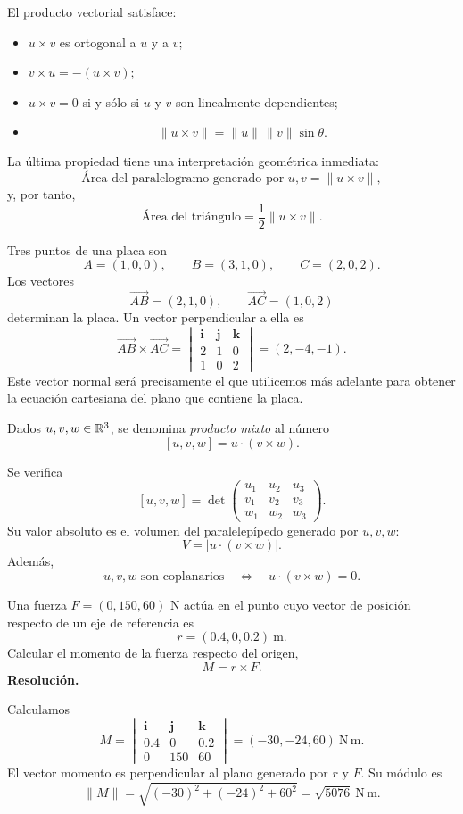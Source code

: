 El producto vectorial satisface:
\begin{itemize}
\item $u\times v$ es ortogonal a $u$ y a $v$;
\item $v\times u=-(u\times v)$;
\item $u\times v=0$ si y sólo si $u$ y $v$ son linealmente dependientes;
\item
\[
\|u\times v\|=\|u\|\,\|v\|\sin\theta.
\]
\end{itemize}

La última propiedad tiene una interpretación geométrica inmediata:
\[
\text{Área del paralelogramo generado por }u,v
=\|u\times v\|,
\]
y, por tanto,
\[
\text{Área del triángulo}
=\frac12\|u\times v\|.
\]

\begin{example}
Tres puntos de una placa son
\[
A=(1,0,0),\qquad B=(3,1,0),\qquad C=(2,0,2).
\]
Los vectores
\[
\overrightarrow{AB}=(2,1,0),
\qquad
\overrightarrow{AC}=(1,0,2)
\]
determinan la placa. Un vector perpendicular a ella es
\[
\overrightarrow{AB}\times\overrightarrow{AC}
=
\begin{vmatrix}
\mathbf i&\mathbf j&\mathbf k\\
2&1&0\\
1&0&2
\end{vmatrix}
=(2,-4,-1).
\]
Este vector normal será precisamente el que utilicemos más adelante para obtener la ecuación cartesiana del plano que contiene la placa.
\end{example}

\begin{definition}
Dados $u,v,w\in\mathbb{R}^3$, se denomina \emph{producto mixto} al número
\[
[u,v,w]=u\cdot(v\times w).
\]
\end{definition}

Se verifica
\[
[u,v,w]
=
\det
\begin{pmatrix}
u_1&u_2&u_3\\
v_1&v_2&v_3\\
w_1&w_2&w_3
\end{pmatrix}.
\]
Su valor absoluto es el volumen del paralelepípedo generado por $u,v,w$:
\[
V=|u\cdot(v\times w)|.
\]
Además,
\[
u,v,w\text{ son coplanarios}
\quad\Longleftrightarrow\quad
u\cdot(v\times w)=0.
\]

\begin{solvedexercise}
Una fuerza $F=(0,150,60)$ N actúa en el punto cuyo vector de posición respecto de un eje de referencia es
\[
r=(0.4,0,0.2)\ \mathrm{m}.
\]
Calcular el momento de la fuerza respecto del origen,
\[
M=r\times F.
\]
\tcblower
\textbf{Resolución.}\par\smallskip
Calculamos
\[
M=
\begin{vmatrix}
\mathbf i&\mathbf j&\mathbf k\\
0.4&0&0.2\\
0&150&60
\end{vmatrix}
=(-30,-24,60)\ \mathrm{N\,m}.
\]
El vector momento es perpendicular al plano generado por $r$ y $F$. Su módulo es
\[
\|M\|=\sqrt{(-30)^2+(-24)^2+60^2}
=\sqrt{5076}\ \mathrm{N\,m}.
\]
\end{solvedexercise}

